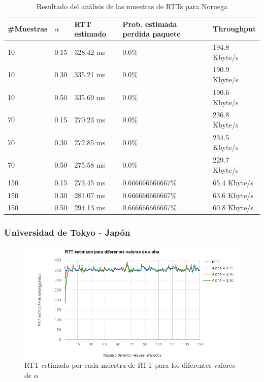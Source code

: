 \begin{table}[H]
	\centering
    \begin{tabular}{lllll}
    \hline
    \#Muestras & $\alpha$ & RTT estimado &Prob. estimada perdida paquete & Throughput \\	\hline
    10   &  0.15  &  328.42 ms  &  0.0\%  &  194.8 Kbyte/s  \\
    10   &  0.30  &  335.21 ms  &  0.0\%  &  190.9 Kbyte/s  \\
    10   &  0.50  &  335.69 ms  &  0.0\%  &  190.6 Kbyte/s  \\
    70   &  0.15  &  270.23 ms  &  0.0\%  &  236.8 Kbyte/s  \\
    70   &  0.30  &  272.85 ms  &  0.0\%  &  234.5 Kbyte/s  \\
    70   &  0.50  &  275.58 ms  &  0.0\%  &  229.7 Kbyte/s  \\
    150  &  0.15  &  273.45 ms  &  0.666666666667\%  &  65.4 Kbyte/s  \\
    150  &  0.30  &  281.07 ms  &  0.666666666667\%  &  63.6 Kbyte/s  \\
    150  &  0.50  &  294.13 ms  &  0.666666666667\%  &  60.8 Kbyte/s  \\ \hline
    \end{tabular}
    \caption{Resultado del análisis de las muestras de RTTs para Noruega}
  \label{fig:tabla-ertt-nor}
\end{table}

\subsubsection{Universidad de Tokyo - Japón}

\begin{figure}[H]
\begin{changemargin}{-5cm}{-5cm}
    \includegraphics[width=1.5\textwidth]{../Experimentacion/Tokyo/ertt.png}
    \caption{RTT estimado por cada muestra de RTT para los diferentes valores de $\alpha$}
  \label{ertt-tok}
\end{changemargin}
\end{figure}

